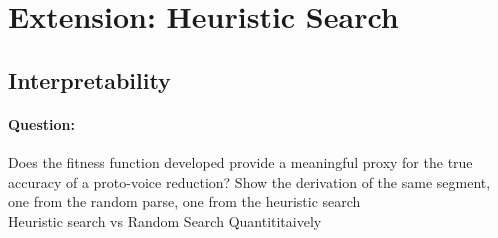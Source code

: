 \documentclass[12pt,a4paper,twoside,openany]{report} \usepackage[pdfborder={0 0 0}]{hyperref}    %
\theoremstyle{definition} \newtheorem{definition}{Definition}[section]
\begin{document}
%

  \section{Extension: Heuristic Search}
  \label{sec:evalExtension}

  \subsection{Interpretability}
  \paragraph{Question:} {Does the fitness function developed provide a meaningful proxy for the true accuracy of
  a proto-voice reduction?}
  \label{sub:evalInterpret}
  Show the derivation of the same segment, one from the random parse, one from the heuristic search\\
  Heuristic search vs Random Search Quantititaively \\
\end{document}
